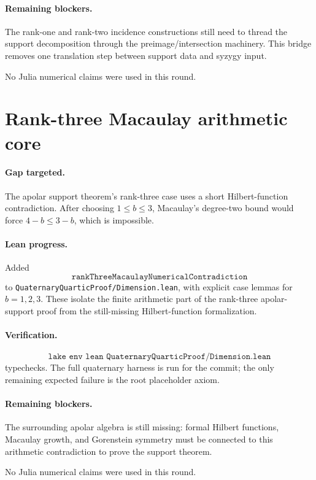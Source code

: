 \documentclass[11pt]{article}
\begin{document}
\paragraph{Remaining blockers.}
The rank-one and rank-two incidence constructions still need to thread the
support decomposition through the preimage/intersection machinery.  This bridge
removes one translation step between support data and syzygy input.

No Julia numerical claims were used in this round.

\section*{Rank-three Macaulay arithmetic core}

\paragraph{Gap targeted.}
The apolar support theorem's rank-three case uses a short Hilbert-function
contradiction.  After choosing \(1\le b\le3\), Macaulay's degree-two bound would
force \(4-b\le 3-b\), which is impossible.

\paragraph{Lean progress.}
Added
\[
\texttt{rankThreeMacaulayNumericalContradiction}
\]
to \texttt{QuaternaryQuarticProof/Dimension.lean}, with explicit case lemmas
for \(b=1,2,3\).  These isolate the finite arithmetic part of the
rank-three apolar-support proof from the still-missing Hilbert-function
formalization.

\paragraph{Verification.}
\[
\texttt{lake env lean QuaternaryQuarticProof/Dimension.lean}
\]
typechecks.  The full quaternary harness is run for the commit; the only
remaining expected failure is the root placeholder axiom.

\paragraph{Remaining blockers.}
The surrounding apolar algebra is still missing: formal Hilbert functions,
Macaulay growth, and Gorenstein symmetry must be connected to this arithmetic
contradiction to prove the support theorem.

No Julia numerical claims were used in this round.
\end{document}
